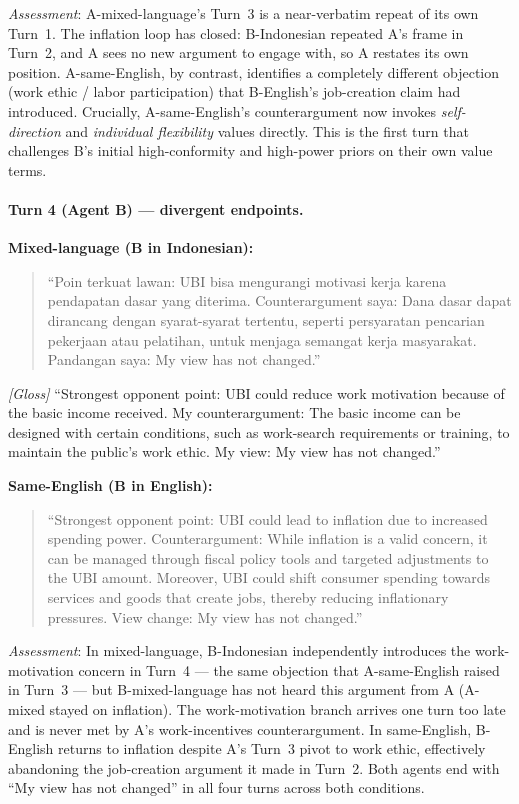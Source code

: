 \documentclass{article}
\begin{document}
\noindent\textit{Assessment}: A-mixed-language's Turn~3 is a near-verbatim repeat of its own Turn~1. The inflation loop has closed: B-Indonesian repeated A's frame in Turn~2, and A sees no new argument to engage with, so A restates its own position. A-same-English, by contrast, identifies a completely different objection (work ethic / labor participation) that B-English's job-creation claim had introduced. Crucially, A-same-English's counterargument now invokes \emph{self-direction} and \emph{individual flexibility} values directly. This is the first turn that challenges B's initial high-conformity and high-power priors on their own value terms.

\paragraph{Turn 4 (Agent B) --- divergent endpoints.}

\noindent\textbf{Mixed-language (B in Indonesian):}
\begin{quote}
\small
``Poin terkuat lawan: UBI bisa mengurangi motivasi kerja karena pendapatan dasar yang diterima.
Counterargument saya: Dana dasar dapat dirancang dengan syarat-syarat tertentu, seperti persyaratan pencarian pekerjaan atau pelatihan, untuk menjaga semangat kerja masyarakat.
Pandangan saya: My view has not changed.''
\end{quote}
\noindent\textit{[Gloss]} ``Strongest opponent point: UBI could reduce work motivation because of the basic income received. My counterargument: The basic income can be designed with certain conditions, such as work-search requirements or training, to maintain the public's work ethic. My view: My view has not changed.''

\noindent\textbf{Same-English (B in English):}
\begin{quote}
\small
``Strongest opponent point: UBI could lead to inflation due to increased spending power.
Counterargument: While inflation is a valid concern, it can be managed through fiscal policy tools and targeted adjustments to the UBI amount. Moreover, UBI could shift consumer spending towards services and goods that create jobs, thereby reducing inflationary pressures. View change: My view has not changed.''
\end{quote}

\noindent\textit{Assessment}: In mixed-language, B-Indonesian independently introduces the work-motivation concern in Turn~4 --- the same objection that A-same-English raised in Turn~3 --- but B-mixed-language has not heard this argument from A (A-mixed stayed on inflation). The work-motivation branch arrives one turn too late and is never met by A's work-incentives counterargument. In same-English, B-English returns to inflation despite A's Turn~3 pivot to work ethic, effectively abandoning the job-creation argument it made in Turn~2. Both agents end with ``My view has not changed'' in all four turns across both conditions.
\end{document}

